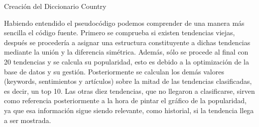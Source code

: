 \begin{algorithm}[H]


    \caption{Creación del Diccionario Country}

\end{algorithm}

\vspace{0.3cm}

Habiendo entendido el pseudocódigo podemos comprender de una manera más sencilla el código fuente. Primero se comprueba si existen tendencias viejas, después se procedería a asignar una estructura constituyente a dichas tendencias mediante la unión y la diferencia simétrica. Además, sólo se procede al final con 20 tendencias y se calcula su popularidad, esto es debido a la optimización de la base de datos y su gestión. Posteriormente se calculan los demás valores (keywords, sentimientos y artículos) sobre la mitad de las tendencias clasificadas, es decir, un top 10. Las otras diez tendencias, que no llegaron a clasificarse, sirven como referencia posteriormente a la hora de pintar el gráfico de la popularidad, ya que esa información sigue siendo relevante, como historial, si la tendencia llega a ser mostrada.

\vspace{0.3cm}

